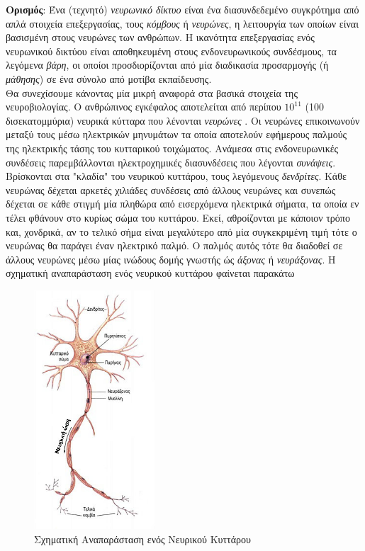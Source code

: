 \documentclass[11pt]{article} %
\numberwithin{equation}{subsection}
\begin{document}
\textbf{Ορισμός}: Ένα (τεχνητό) \textit{νευρωνικό δίκτυο} είναι ένα διασυνδεδεμένο συγκρότημα από απλά στοιχεία επεξεργασίας, τους \textit{κόμβους} ή \textit{νευρώνες}, η λειτουργία των οποίων είναι βασισμένη στους νευρώνες των ανθρώπων. Η ικανότητα επεξεργασίας ενός νευρωνικού δικτύου είναι αποθηκευμένη στους ενδονευρωνικούς συνδέσμους, τα λεγόμενα \textit{βάρη}, οι οποίοι προσδιορίζονται από μία διαδικασία προσαρμογής (ή \textit{μάθησης}) σε ένα σύνολο από μοτίβα εκπαίδευσης.\\

Θα συνεχίσουμε κάνοντας μία μικρή αναφορά στα βασικά στοιχεία της νευροβιολογίας. Ο ανθρώπινος εγκέφαλος αποτελείται από περίπου $10^{11}$ (100 δισεκατομμύρια) νευρικά κύτταρα που λένονται \textit{νευρώνες} \cite{neuralnets}. Οι νευρώνες επικοινωνούν μεταξύ τους μέσω ηλεκτρικών μηνυμάτων τα οποία αποτελούν εφήμερους παλμούς της ηλεκτρικής τάσης του κυτταρικού τοιχώματος. Ανάμεσα στις ενδονευρωνικές συνδέσεις παρεμβάλλονται ηλεκτροχημικές διασυνδέσεις που λέγονται \textit{συνάψεις}. Βρίσκονται στα "κλαδία" του νευρικού κυττάρου, τους λεγόμενους \textit{δενδρίτες}. Κάθε νευρώνας δέχεται αρκετές χιλιάδες συνδέσεις από άλλους νευρώνες και συνεπώς δέχεται σε κάθε στιγμή μία πληθώρα από εισερχόμενα ηλεκτρικά σήματα, τα οποία εν τέλει φθάνουν στο κυρίως σώμα του κυττάρου. Εκεί, αθροίζονται με κάποιον τρόπο και, χονδρικά, αν το τελικό σήμα είναι μεγαλύτερο από μία συγκεκριμένη τιμή τότε ο νευρώνας θα παράγει έναν ηλεκτρικό παλμό. Ο παλμός αυτός τότε θα διαδοθεί  σε άλλους νευρώνες μέσω μίας ινώδους δομής γνωστής ώς \textit{άξονας} ή \textit{νευράξονας}. Η σχηματική αναπαράσταση ενός νευρικού κυττάρου φαίνεται παρακάτω\\
\begin{figure}[H]
    \centering
    \includegraphics[width=0.4\textwidth]{nevronas}
    \caption{Σχηματική Αναπαράσταση ενός Νευρικού Κυττάρου}
    \label{fig:Neuron Cell}
\end{figure}
\end{document}
